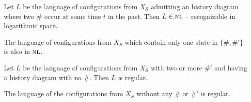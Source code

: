 \documentclass{jac}
\theoremstyle{definition}
\begin{document}
\begin{lemma}
  \label{validlanguage}
  Let $L$ be the language of configurations from $X_S$ admitting an
  history diagram where two $\#$ occur at some time $t$ in the
  past. Then $L\in\textsc{nl}$ -- recognizable in logarithmic space.
\end{lemma}

\begin{lemma}
  \label{one-ptime}
  The language of configurations from $X_S$ which contain only one state in
  $\{\#,\#'\}$ is also in $\textsc{nl}$.
\end{lemma}

\begin{lemma}
  \label{neutral-sharpsprime}
  Let $L$ be the language of configurations from $X_S$ with two or
  more $\#'$ and having a history diagram with no $\#$.  Then $L$ is
  regular.
\end{lemma}

\begin{lemma}
  \label{zero-regular}
  The language of the configurations from $X_S$ without any $\#$ or
  $\#'$ is regular.
\end{lemma}
\end{document}

